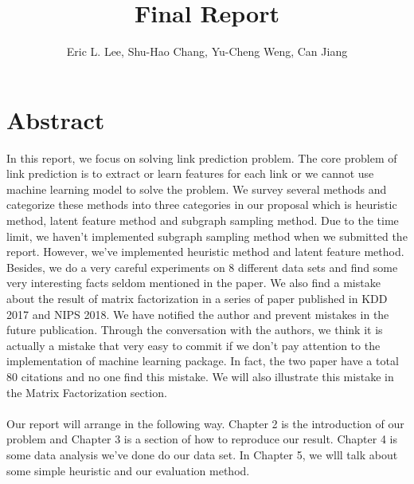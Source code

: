 \documentclass[12pt]{article}
\begin{document}
 
\title{Final Report}
\author{Eric L. Lee, Shu-Hao Chang, Yu-Cheng Weng, Can Jiang} 
\maketitle

\section{Abstract}

In this report, we focus on solving link prediction problem. The core problem of link prediction is to extract or learn features for each link or we cannot use machine learning model to solve the problem. We survey several methods and categorize these methods into three categories in our proposal which is heuristic method, latent feature method and subgraph sampling method.
Due to the time limit, we haven't implemented subgraph sampling method when we submitted the report. However, we've implemented heuristic method and latent feature method. Besides, we do a very careful experiments on 8 different data sets and find some very interesting facts seldom mentioned in the paper.  We also find a mistake about the result of matrix factorization in a series of paper published in KDD 2017 and NIPS 2018. We have notified the author and prevent mistakes in the future publication. Through the conversation with the authors, we think it is actually a mistake that very easy to commit if we don't pay attention to the implementation of machine learning package. In fact, the two paper have a total 80 citations and no one find this mistake. We will also illustrate this mistake in the Matrix Factorization section.
\\ \\
Our report will arrange in the following way. Chapter 2 is the introduction of our problem and Chapter 3 is a section of how to reproduce our result. Chapter 4 is some data analysis we've done do our data set. In Chapter 5, we wlll talk about some simple heuristic and our evaluation method. 
\end{document}

